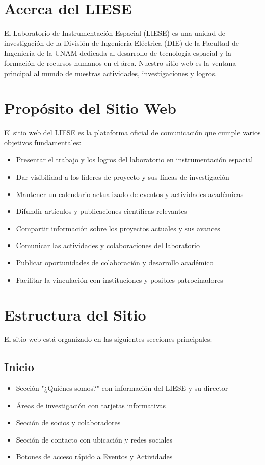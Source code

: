 \documentclass[12pt,letterpaper]{report}
\begin{document}
\section{Acerca del LIESE}
El Laboratorio de Instrumentación Espacial (LIESE) es una unidad de investigación de la División de Ingeniería Eléctrica (DIE) de la Facultad de Ingeniería de la UNAM dedicada al desarrollo de tecnología espacial y la formación de recursos humanos en el área. Nuestro sitio web es la ventana principal al mundo de nuestras actividades, investigaciones y logros.

\section{Propósito del Sitio Web}
El sitio web del LIESE es la plataforma oficial de comunicación que cumple varios objetivos fundamentales:
\begin{itemize}
    \item Presentar el trabajo y los logros del laboratorio en instrumentación espacial
    \item Dar visibilidad a los líderes de proyecto y sus líneas de investigación
    \item Mantener un calendario actualizado de eventos y actividades académicas
    \item Difundir artículos y publicaciones científicas relevantes
    \item Compartir información sobre los proyectos actuales y sus avances
    \item Comunicar las actividades y colaboraciones del laboratorio
    \item Publicar oportunidades de colaboración y desarrollo académico
    \item Facilitar la vinculación con instituciones y posibles patrocinadores
\end{itemize}

\section{Estructura del Sitio}
El sitio web está organizado en las siguientes secciones principales:

\subsection{Inicio}
\begin{itemize}
    \item Sección "¿Quiénes somos?" con información del LIESE y su director
    \item Áreas de investigación con tarjetas informativas
    \item Sección de socios y colaboradores
    \item Sección de contacto con ubicación y redes sociales
    \item Botones de acceso rápido a Eventos y Actividades
\end{itemize}
\end{document}
